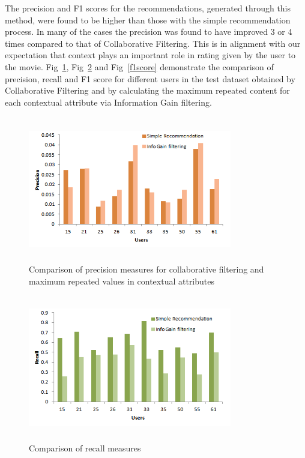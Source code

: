 \documentclass{article}
\begin{document}
The precision and F1 scores for the recommendations, generated through this method, were found to be higher than those with the simple recommendation process. In many of the cases the precision was found to have improved 3 or 4 times compared to that of Collaborative Filtering. This is in alignment with our expectation that context plays an important role in rating given by the user to the movie. Fig~\ref{precision}, Fig~\ref{recall} and Fig~\ref{f1score} demonstrate the comparison of precision, recall and F1 score for different users in the test dataset obtained by Collaborative Filtering and by calculating the maximum repeated content for each contextual attribute via Information Gain filtering.

\begin{figure}[H]
\includegraphics[height=2.5in, width=3.5in]{Precision.png}
\caption{Comparison of precision measures for collaborative filtering and maximum repeated values in contextual attributes}
\label{precision}
\end{figure}

\begin{figure}[H]
\includegraphics[height=2.5in, width=3.5in]{Recall.png}
\caption{Comparison of recall measures}
\label{recall}
\end{figure}
\end{document}
